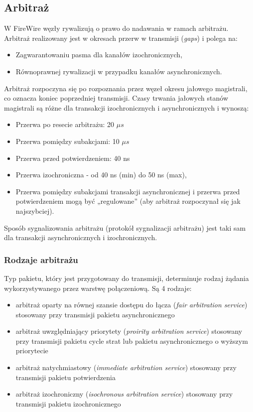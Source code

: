 \subsection{Arbitraż}
W FireWire węzły rywalizują o prawo do nadawania w ramach arbitrażu. Arbitraż realizowany jest w okresach przerw w transmisji (\emph{gaps}) i polega na:
\begin{itemize}
	\item Zagwarantowaniu pasma dla kanałów izochronicznych,
	\item Równoprawnej rywalizacji w przypadku kanałów asynchronicznych.
\end{itemize}
Arbitraż rozpoczyna się po rozpoznania przez węzeł okresu jałowego magistrali, co oznacza koniec poprzedniej transmisji. Czasy trwania jałowych stanów magistrali są różne dla transakcji izochronicznych i asynchronicznych i wynoszą:
\begin{itemize}
	\item Przerwa po resecie arbitrażu: 20 $\mu{s}$
	\item Przerwa pomiędzy subakcjami: 10 $\mu{s}$
	\item Przerwa przed potwierdzeniem: 40 ns
	\item Przerwa izochroniczna - od 40 ns (min) do 50 ns (max),
	\item Przerwa pomiędzy subakcjami transakcji asynchronicznej i przerwa przed potwierdzeniem mogą być „regulowane” (aby arbitraż rozpoczynał się jak najszybciej).
\end{itemize}
Sposób sygnalizowania arbitrażu (protokół sygnalizacji arbitrażu) jest taki sam dla transakcji asynchronicznych i izochronicznych.
\subsubsection{Rodzaje arbitrażu}
Typ pakietu, który jest przygotowany do transmisji, determinuje rodzaj żądania wykorzystywanego przez warstwę połączeniową. Są 4 rodzaje:
\begin{itemize}
	\item  arbitraż oparty na równej szansie dostępu do łącza (\emph{fair arbitration service}) stosowany przy transmisji pakietu asynchronicznego
	\item  arbitraż uwzględniający priorytety (\emph{proirity arbitration service}) stosowany przy transmisji pakietu cycle strat lub pakietu asynchronicznego o wyższym priorytecie
	\item  arbitraż natychmiastowy (\emph{immediate arbitration service}) stosowany przy transmisji pakietu potwierdzenia
	\item  arbitraż izochroniczny (\emph{isochronous arbitration service}) stosowany przy transmisji pakietu izochronicznego
\end{itemize}
